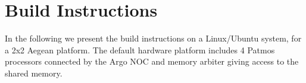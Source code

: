 \documentclass[a4paper,fontsize=10pt,twoside,DIV15,BCOR12mm,headinclude=true,footinclude=false,pagesize,bibtotoc]{scrbook}
\newcommand{\code}[1]{{\texttt{#1}}}
\begin{document}


%
%
%
%


\section{Build Instructions}

In the following we present the build instructions on a Linux/Ubuntu system,
for a 2x2 Aegean platform. The default hardware platform includes 4 Patmos processors 
connected by the Argo NOC and memory arbiter giving access to the shared memory.
\end{document}
